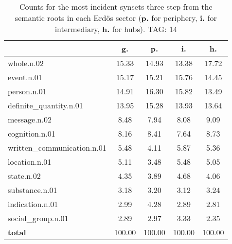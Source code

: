 \begin{table}[h!]
\begin{center}
\begin{tabular}{| l || c | c | c | c |}\hline
 & {\bf g.} & {\bf p.} & {\bf i.} & {\bf h.} \\\hline\hline
whole.n.02 & 15.33  & 14.93  & 13.38  & 17.72 \\\hline
event.n.01 & 15.17  & 15.21  & 15.76  & 14.45 \\\hline
person.n.01 & 14.91  & 16.30  & 15.82  & 13.49 \\\hline
definite\_quantity.n.01 & 13.95  & 15.28  & 13.93  & 13.64 \\\hline
message.n.02 & 8.48  & 7.94  & 8.08  & 9.09 \\\hline
cognition.n.01 & 8.16  & 8.41  & 7.64  & 8.73 \\\hline
written\_communication.n.01 & 5.48  & 4.11  & 5.87  & 5.36 \\\hline
location.n.01 & 5.11  & 3.48  & 5.48  & 5.05 \\\hline
state.n.02 & 4.35  & 3.89  & 4.68  & 4.06 \\\hline
substance.n.01 & 3.18  & 3.20  & 3.12  & 3.24 \\\hline
indication.n.01 & 2.99  & 4.28  & 2.89  & 2.81 \\\hline
social\_group.n.01 & 2.89  & 2.97  & 3.33  & 2.35 \\\hline\hline
{{\bf total}} & 100.00  & 100.00  & 100.00  & 100.00 \\\hline
\end{tabular}
\caption{Counts for the most incident synsets three step from the semantic roots in each Erd\"os sector ({\bf p.} for periphery, {\bf i.} for intermediary, {\bf h.} for hubs). TAG: 14}
\end{center}
\end{table}
